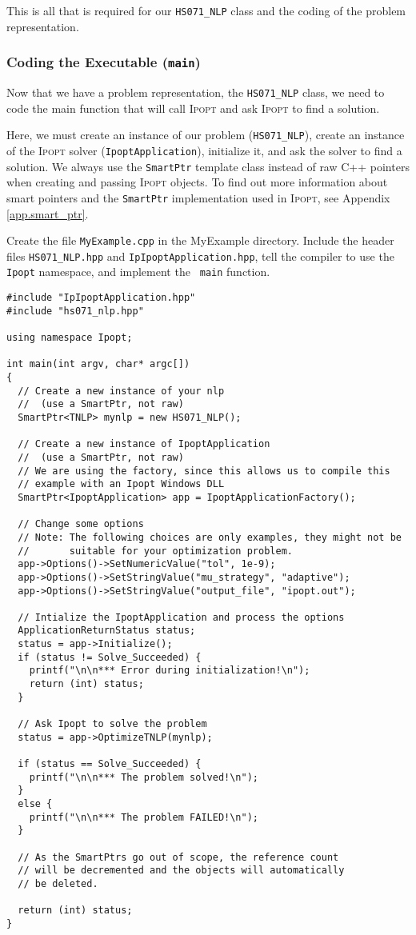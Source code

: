 \documentclass[10pt]{article}
\newcommand{\Ipopt}{\textsc{Ipopt}\xspace}
\begin{document}
This is all that is required for our {\tt HS071\_NLP} class and 
the coding of the problem representation.
 
\subsubsection{Coding the Executable (\texttt{main})}
Now that we have a problem representation, the {\tt HS071\_NLP} class,
we need to code the main function that will call \Ipopt and ask \Ipopt
to find a solution.

Here, we must create an instance of our problem ({\tt HS071\_NLP}),
create an instance of the \Ipopt solver (\texttt{IpoptApplication}),
initialize it, and ask the solver to find a solution. We always use
the \texttt{SmartPtr} template class instead of raw C++ pointers when
creating and passing \Ipopt objects. To find out more information
about smart pointers and the {\tt SmartPtr} implementation used in
\Ipopt, see Appendix \ref{app.smart_ptr}.

Create the file {\tt MyExample.cpp} in the MyExample directory.
Include the header files {\tt HS071\_NLP.hpp} and {\tt IpIpoptApplication.hpp}, tell
the compiler to use the {\tt Ipopt} namespace, and implement the {\tt
  main} function.

\begin{footnotesize}
\begin{verbatim}
#include "IpIpoptApplication.hpp"
#include "hs071_nlp.hpp"

using namespace Ipopt;

int main(int argv, char* argc[])
{
  // Create a new instance of your nlp 
  //  (use a SmartPtr, not raw)
  SmartPtr<TNLP> mynlp = new HS071_NLP();

  // Create a new instance of IpoptApplication
  //  (use a SmartPtr, not raw)
  // We are using the factory, since this allows us to compile this
  // example with an Ipopt Windows DLL
  SmartPtr<IpoptApplication> app = IpoptApplicationFactory();

  // Change some options
  // Note: The following choices are only examples, they might not be
  //       suitable for your optimization problem.
  app->Options()->SetNumericValue("tol", 1e-9);
  app->Options()->SetStringValue("mu_strategy", "adaptive");
  app->Options()->SetStringValue("output_file", "ipopt.out");

  // Intialize the IpoptApplication and process the options
  ApplicationReturnStatus status;
  status = app->Initialize();
  if (status != Solve_Succeeded) {
    printf("\n\n*** Error during initialization!\n");
    return (int) status;
  }

  // Ask Ipopt to solve the problem
  status = app->OptimizeTNLP(mynlp);

  if (status == Solve_Succeeded) {
    printf("\n\n*** The problem solved!\n");
  }
  else {
    printf("\n\n*** The problem FAILED!\n");
  }

  // As the SmartPtrs go out of scope, the reference count
  // will be decremented and the objects will automatically 
  // be deleted.

  return (int) status;
}
\end{verbatim} 
\end{footnotesize}
\end{document}
